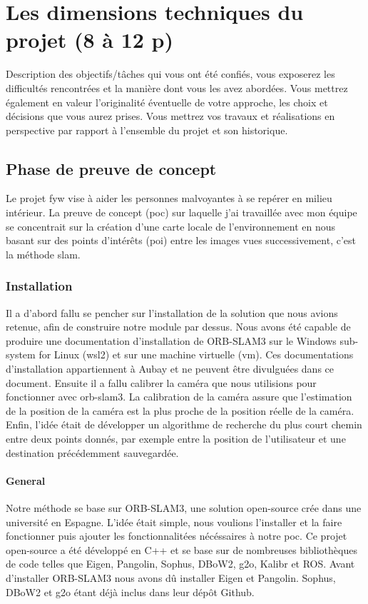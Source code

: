 \documentclass[11pt]{article}
\begin{document}
    \pagebreak
  
  \section{Les dimensions techniques du projet (8 à 12 p)}
    Description des objectifs/tâches qui vous ont été confiés, vous exposerez les difficultés rencontrées et la manière dont vous
    les avez abordées.  Vous mettrez également en valeur l’originalité éventuelle de votre approche, les
    choix et décisions que vous aurez prises. Vous mettrez vos travaux et réalisations en perspective par
    rapport à l’ensemble du projet et son historique.

    \subsection{Phase de preuve de concept}
      Le projet \acrshort{fyw} vise à aider les personnes malvoyantes à se repérer en milieu intérieur. 
      La preuve de concept (\acrshort{poc}) sur laquelle j'ai travaillée avec mon équipe se concentrait sur la création d'une carte locale
      de l'environnement en nous basant sur des points d'intérêts (\acrshort{poi}) entre les images vues successivement, c'est la méthode
      \acrshort{slam}.
      \subsubsection{Installation}
        Il a d'abord fallu se pencher sur l'installation de la solution que nous avions retenue, afin de construire notre module par dessus.
        Nous avons été capable de produire une documentation d'installation de ORB-SLAM3 sur le Windows sub-system for Linux (\acrshort{wsl2})
        et sur une machine virtuelle (\acrshort{vm}). Ces documentations d'installation appartiennent à Aubay et ne peuvent être divulguées dans
        ce document.
        Ensuite il a fallu calibrer la caméra que nous utilisions pour fonctionner avec \acrshort{orb}-\acrshort{slam}3. 
        La calibration de la caméra assure que l'estimation de la position de la caméra est la plus proche de la position réelle de la caméra.
        Enfin, l'idée était de développer un algorithme de recherche du plus court chemin entre deux points donnés, par exemple entre la position
        de l'utilisateur et une destination précédemment sauvegardée.      
            
        \paragraph{General}
          Notre méthode se base sur ORB-SLAM3, une solution open-source crée dans une université en Espagne. L'idée était simple, nous voulions
          l'installer et la faire fonctionner puis ajouter les fonctionnalitées nécéssaires à notre \acrshort{poc}. Ce projet open-source a été
          développé en C++ et se base sur de nombreuses bibliothèques de code telles que Eigen, Pangolin, Sophus, DBoW2, g2o, Kalibr et ROS.
          Avant d'installer ORB-SLAM3 nous avons dû installer Eigen et Pangolin. Sophus, DBoW2 et g2o étant déjà inclus dans leur dépôt Github.
\end{document}
